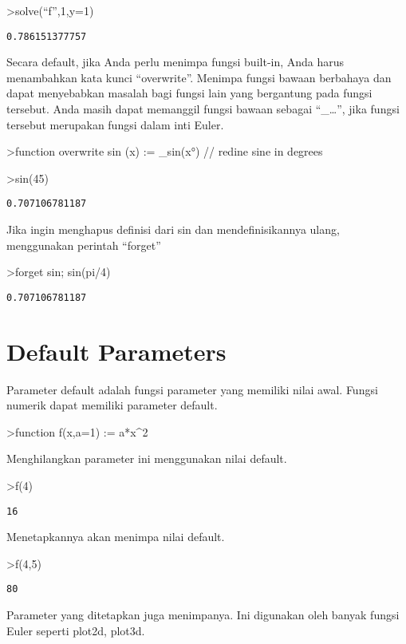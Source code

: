 \documentclass[
]{book}
\begin{document}
\textgreater solve(``f'',1,y=1)

\begin{verbatim}
0.786151377757
\end{verbatim}

Secara default, jika Anda perlu menimpa fungsi built-in, Anda harus menambahkan kata kunci ``overwrite''. Menimpa fungsi bawaan berbahaya dan dapat menyebabkan masalah bagi fungsi lain yang bergantung pada fungsi tersebut. Anda masih dapat memanggil fungsi bawaan sebagai ``\_\ldots'', jika fungsi tersebut merupakan fungsi dalam inti Euler.

\textgreater function overwrite sin (x) := \_sin(x°) // redine sine in degrees

\textgreater sin(45)

\begin{verbatim}
0.707106781187
\end{verbatim}

Jika ingin menghapus definisi dari sin dan mendefinisikannya ulang, menggunakan perintah ``forget''

\textgreater forget sin; sin(pi/4)

\begin{verbatim}
0.707106781187
\end{verbatim}

\chapter{Default Parameters}\label{default-parameters}

Parameter default adalah fungsi parameter yang memiliki nilai awal. Fungsi numerik dapat memiliki parameter default.

\textgreater function f(x,a=1) := a*x\^{}2

Menghilangkan parameter ini menggunakan nilai default.

\textgreater f(4)

\begin{verbatim}
16
\end{verbatim}

Menetapkannya akan menimpa nilai default.

\textgreater f(4,5)

\begin{verbatim}
80
\end{verbatim}

Parameter yang ditetapkan juga menimpanya. Ini digunakan oleh banyak fungsi Euler seperti plot2d, plot3d.
\end{document}
